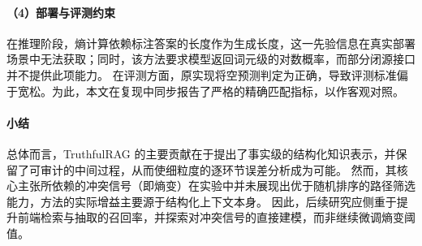 \paragraph{（4）部署与评测约束}
在推理阶段，熵计算依赖标注答案的长度作为生成长度，这一先验信息在真实部署场景中无法获取；同时，该方法要求模型返回词元级的对数概率，而部分闭源接口并不提供此项能力。
在评测方面，原实现将空预测判定为正确，导致评测标准偏于宽松。为此，本文在复现中同步报告了严格的精确匹配指标，以作客观对照。

\paragraph{小结}
总体而言，TruthfulRAG 的主要贡献在于提出了事实级的结构化知识表示，并保留了可审计的中间过程，从而使细粒度的逐环节误差分析成为可能。
然而，其核心主张所依赖的冲突信号（即熵变）在实验中并未展现出优于随机排序的路径筛选能力，方法的实际增益主要源于结构化上下文本身。
因此，后续研究应侧重于提升前端检索与抽取的召回率，并探索对冲突信号的直接建模，而非继续微调熵变阈值。